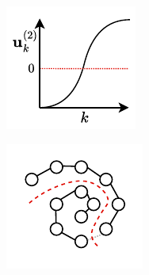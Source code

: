 \begin{figure}[h!]
    \centering
    \begin{subfigure}[b]{0.20\textwidth}
        \centering
        \includegraphics[width=\textwidth]{images/spec_u.svg.pdf}
        \label{fig:spec_1}
    \end{subfigure}
    \hfill
    \begin{subfigure}[b]{0.23\textwidth}
        \centering
        \includegraphics[width=\textwidth]{images/spec_g.drawio.svg.pdf}

\end{subfigure}
\end{figure}
